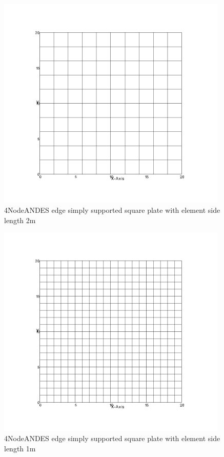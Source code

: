 \documentclass[fleqn,11pt,letter]{article}
\begin{document}
\begin{figure}[H]
  \centering
  \includegraphics[width=11cm]{../Figure_files/4NodeANDES/square_plate3.png}
  \caption{4NodeANDES edge simply supported square plate with element side length 2m }
  \label{fig 4NodeANDES edges simply supported square plate with element side length 2m }
\end{figure}

\newpage

\begin{figure}[H]
  \centering
  \includegraphics[width=11cm]{../Figure_files/4NodeANDES/square_plate4.png}
  \caption{4NodeANDES edge simply supported square plate with element side length 1m }
  \label{fig 4NodeANDES edges simply supported square plate with element side length 1m }
\end{figure}
\end{document}
